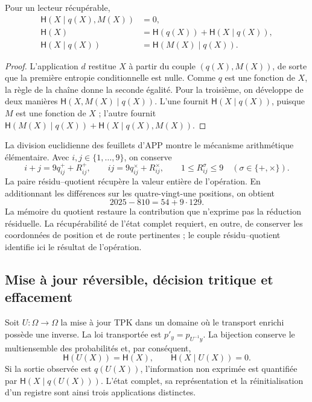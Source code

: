 \begin{proposition}
Pour un lecteur récupérable,
\begin{align}
 \mathsf H(X\mid q(X),M(X))&=0,\\
 \mathsf H(X)&=\mathsf H(q(X))+\mathsf H(X\mid q(X)),\\
 \mathsf H(X\mid q(X))&=\mathsf H(M(X)\mid q(X)).
 \label{v:ant:eq:ii-kb-aut-fibra}
\end{align}
\end{proposition}
\begin{proof}
L'application \(d\) restitue \(X\) à partir du couple \((q(X),M(X))\),
de sorte que la première entropie conditionnelle est nulle. Comme \(q\) est
une fonction de \(X\), la règle de la chaîne donne la seconde égalité.
Pour la troisième, on développe de deux manières
\(\mathsf H(X,M(X)\mid q(X))\). L'une fournit
\(\mathsf H(X\mid q(X))\), puisque \(M\) est une fonction de \(X\) ;
l'autre fournit
\(\mathsf H(M(X)\mid q(X))+\mathsf H(X\mid q(X),M(X))\).
\end{proof}

La division euclidienne des feuillets d'APP montre le mécanisme
arithmétique élémentaire. Avec \(i,j\in\{1,\ldots,9\}\), on conserve
\[
 i+j=9q^+_{ij}+R^+_{ij},\qquad
 ij=9q^\times_{ij}+R^\times_{ij},\qquad
 1\leq R^\sigma_{ij}\leq9\quad(\sigma\in\{+,\times\}).
\]
La paire résidu--quotient récupère la valeur entière de l'opération. En additionnant les différences sur les quatre-vingt-une positions, on obtient
\[
 2025-810=54+9\cdot129.
\]
La mémoire du quotient restaure la contribution que n’exprime pas la
réduction résiduelle. La récupérabilité de l’état complet requiert,
en outre, de conserver les coordonnées de position et de route pertinentes ;
le couple résidu--quotient identifie ici le résultat de l’opération.

\subsection{Mise à jour réversible, décision tritique et effacement}

Soit \(U:\Omega\to\Omega\) la mise à jour TPK dans un domaine où le transport enrichi possède une inverse. La loi transportée est \(p'_y=p_{U^{-1}y}\). La bijection conserve le multiensemble des probabilités et, par conséquent,
\begin{equation}
 \mathsf H(U(X))=\mathsf H(X),\qquad
 \mathsf H(X\mid U(X))=0.
 \label{v:ant:eq:ii-kb-aut-reversible}
\end{equation}
Si la sortie observée est \(q(U(X))\), l’information non exprimée
est quantifiée par \(\mathsf H(X\mid q(U(X)))\). L’état complet,
sa représentation et la réinitialisation d’un registre sont ainsi trois applications distinctes.

